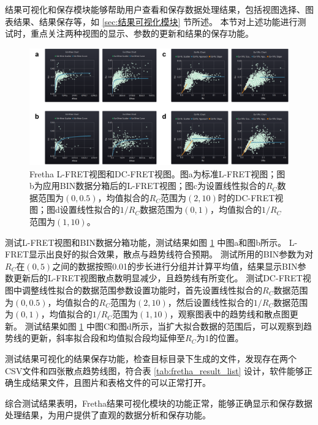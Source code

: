 结果可视化和保存模块能够帮助用户查看和保存数据处理结果，包括视图选择、图表结果、结果保存等，如 \ref{sec:结果可视化模块} 节所述。
本节对上述功能进行测试时，重点关注两种视图的显示、参数的更新和结果的保存功能。
\begin{figure}[htbp]
  \centering
  \includegraphics[width=1\linewidth]{../figures/3/测试-结果可视化.drawio.png}
  \caption[Fretha L-FRET视图测试结果]{Fretha L-FRET视图和DC-FRET视图。图a为标准L-FRET视图；图b为应用BIN数据分箱后的L-FRET视图；图c为设置线性拟合的$R_C$数据范围为$(0,0.5)$，均值拟合的$R_C$范围为$(2,10)$时的DC-FRET视图；图d设置线性拟合的$1/R_C$数据范围为$(0,1)$，均值拟合的$1/R_C$范围为$(1,10)$。}
  \label{fig:L-FRET视图测试}
\end{figure}

测试L-FRET视图和BIN数据分箱功能，测试结果如图 \ref{fig:L-FRET视图测试} 中图a和图b所示。
L-FRET显示出良好的拟合效果，散点与趋势线符合预期。
测试所用的BIN参数为对$R_C$在$(0,5)$之间的数据按照0.01的步长进行分组并计算平均值，结果显示BIN参数更新后的L-FRET视图散点数明显减少，且趋势线有所变化。
测试DC-FRET视图中调整线性拟合的数据范围参数设置功能时，首先设置线性拟合的$R_C$数据范围为$(0,0.5)$，均值拟合的$R_C$范围为$(2,10)$，然后设置线性拟合的$1/R_C$数据范围为$(0,1)$，均值拟合的$1/R_C$范围为$(1,10)$，观察图表中的趋势线和散点图更新。
测试结果如图 \ref{fig:L-FRET视图测试} 中图C和图d所示，当扩大拟合数据的范围后，可以观察到趋势线的更新，斜率拟合段和均值拟合段均延伸至$R_C$为1的位置。

测试结果可视化的结果保存功能，检查目标目录下生成的文件，发现存在两个CSV文件和四张散点趋势线图，符合表 \ref{tab:fretha_result_list} 设计，软件能够正确生成结果文件，且图片和表格文件的可以正常打开。

综合测试结果表明，Fretha结果可视化模块的功能正常，能够正确显示和保存数据处理结果，为用户提供了直观的数据分析和保存功能。

